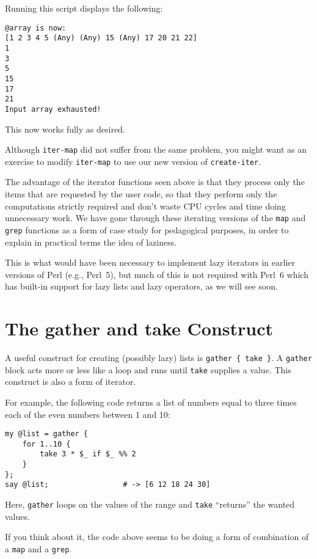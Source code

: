 Running this script displays the following:
\begin{verbatim}
@array is now:
[1 2 3 4 5 (Any) (Any) 15 (Any) 17 20 21 22]
1
3
5
15
17
21
Input array exhausted!
\end{verbatim}

This now works fully as desired.

Although {\tt iter-map} did not suffer from the same problem, 
you might want as an exercise to modify {\tt iter-map}
to use our new version of {\tt create-iter}.

The advantage of the iterator functions seen above is that they 
process only the items that are requested by the user code, so 
that they perform only the computations strictly required and 
don't waste CPU cycles and time doing unnecessary work. We have 
gone through these iterating versions of the {\tt map} 
and {\tt grep} functions as a form of case study for 
pedagogical purposes, in order to explain in practical terms 
the idea of laziness. 

This is what would have been necessary to implement lazy 
iterators in earlier versions of Perl (e.g., Perl~5), but 
much of this is not required with Perl~6 which has built-in 
support for lazy lists and lazy operators, as we will see soon.

\section{The gather and take Construct}

A useful construct for creating (possibly lazy) lists 
is  \verb'gather { take }'. A \verb'gather' block 
acts more or less like a loop and runs until 
\verb'take' supplies a value. This construct is also 
a form of iterator.

For example, the following code returns a list of 
numbers equal to three times each of the even numbers 
between 1 and 10:

\begin{verbatim}
my @list = gather { 
    for 1..10 {
        take 3 * $_ if $_ %% 2
    } 
};
say @list;                 # -> [6 12 18 24 30]
\end{verbatim}

Here, \verb'gather' loops on the values of the range 
and {\tt take} ``returns'' the wanted values.

If you think about it, the code above seems to 
be doing a form of combination of a {\tt map} and a 
{\tt grep}.

